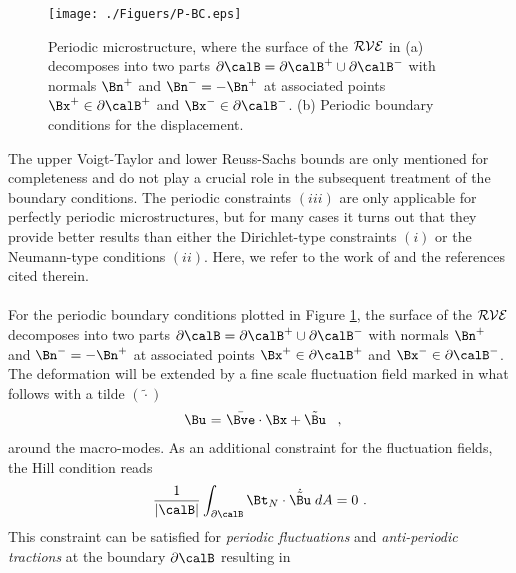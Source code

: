 \documentclass[final,3p,times]{elsarticle}
\begin{document}
%
\begin{figure}[b]%
\centering%
%
\texttt{[image: ./Figuers/P-BC.eps]}	
%
\caption{Periodic microstructure, where the surface of the $\cal{RVE}$ in (a) decomposes into two parts $\partial\calB=\partial\calB^+\cup\partial\calB^-$ with normals $\Bn^+$ and $\Bn^-=-\Bn^+$ at associated points $\Bx^+\in\partial\calB^+$ and $\Bx^-\in\partial\calB^-$. (b)	Periodic boundary conditions for the displacement.}
%
\label{Periodic-BCs}%
\end{figure}%
%
The upper Voigt-Taylor and lower Reuss-Sachs bounds are only mentioned
for completeness and do not play a crucial role in the subsequent
treatment of the boundary conditions. The periodic constraints $(iii)$ are only applicable for perfectly periodic microstructures, but for many cases it turns out that they provide better results than either the Dirichlet-type constraints $(i)$ or the Neumann-type conditions $(ii)$. Here, we refer to the work
of \citet{ZoWr05} and the references cited therein.
\\
\\
For the periodic boundary conditions plotted in Figure \ref{Periodic-BCs}, the surface of the $\cal{RVE}$ decomposes into two parts $\partial\calB=\partial\calB^+\cup\partial\calB^-$ with normals $\Bn^+$ and $\Bn^-=-\Bn^+$ at associated points $\Bx^+\in\partial\calB^+$ and $\Bx^-\in\partial\calB^-$. The deformation will be extended by a fine scale
fluctuation field marked in what follows with a tilde $(\tilde{\cdot} )$
%
%
\begin{equation}
\begin{array}{r@{\ }c@{\ }l}
\Bu &=& \bar\Bve\cdot\Bx+\tilde\Bu 
\end{array}
\ ,
\label{eq:homo9}
\end{equation}%
around the macro-modes.  As an additional constraint for the fluctuation fields, the Hill condition reads
%
\begin{equation}
\frac{1}{|\calB|} \int_{\partial\calB}
\Bt_N\cdot\dot{\tilde\Bu}  \; dA = 0
\ .
\label{eq:homo10}
\end{equation}
This constraint can be satisfied for \textit{periodic fluctuations} and
\textit{anti-periodic tractions} at the boundary $\partial\calB$
resulting in
\end{document}
